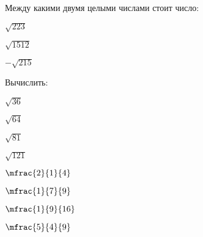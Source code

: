 \begin{class}[number=3]
\begin{listofex}
\begin{enumcols}[itemcolumns=3]
			\item {}
			\item {}
			\item {}
			\item {}
			\item {}
		\end{enumcols}
		\item Между какими двумя целыми числами стоит число:
		\begin{enumcols}[itemcolumns=3]
			\item \( \sqrt{223} \)
			\item \( \sqrt{1512} \)
			\item \( -\sqrt{215} \)
		\end{enumcols}
	\end{listofex}
\end{class}
%
%
\begin{homework}[number=1]
	\begin{listofex}
		\item Вычислить:
		\begin{enumcols}[itemcolumns=4]
				\item \( \sqrt{36} \)
				\item \( \sqrt{64} \)
				\item \( \sqrt{81} \)
				\item \( \sqrt{121} \)
				\item \( \mfrac{2}{1}{4} \)
				\item \( \mfrac{1}{7}{9} \)
				\item \( \mfrac{1}{9}{16} \)
				\item \( \mfrac{5}{4}{9} \)
		\end{enumcols}
	\end{listofex}
\end{homework}
%
